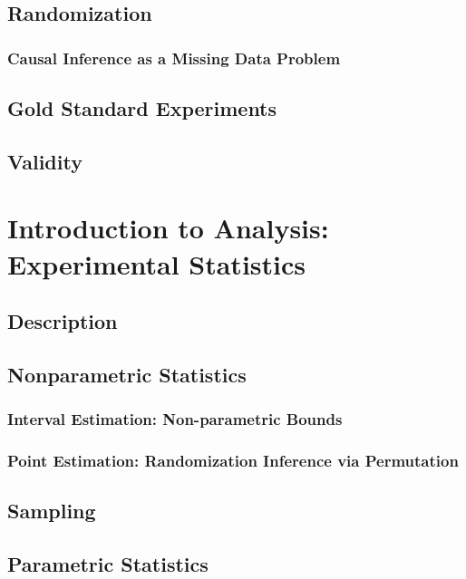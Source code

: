 \documentclass[12pt]{article}
\begin{document}

\subsection{Randomization}
\subsubsection{Causal Inference as a Missing Data Problem}

\subsection{Gold Standard Experiments}

\subsection{Validity}




\section{Introduction to Analysis: Experimental Statistics}
\subsection{Description}

\subsection{Nonparametric Statistics}
\subsubsection{Interval Estimation: Non-parametric Bounds}
\subsubsection{Point Estimation: Randomization Inference via Permutation}

\subsection{Sampling}


\subsection{Parametric Statistics}
\end{document}
